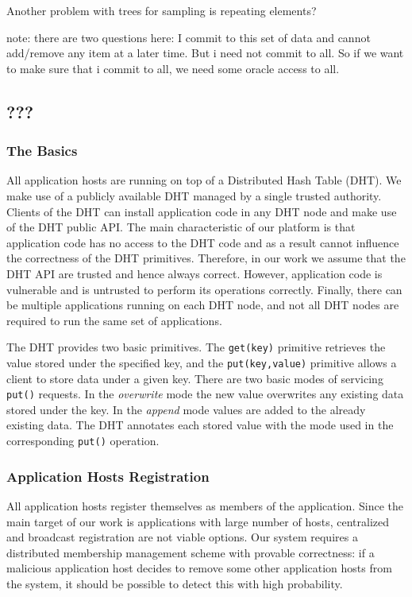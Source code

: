\documentclass[11pt,twocolumn]{MyTightStyle}
\theoremstyle{plain}
\theoremstyle{definition}
\theoremstyle{remark}
\numberwithin{equation}{section}
\begin{document}
Another problem with trees for sampling is repeating elements? 



note: there are two questions here: I commit to this set of data and
cannot add/remove any item at a later time. But i need not commit to
all. So if we want to make sure that i commit to all, we need some
oracle access to all.






\subsection{???}

\subsubsection{The Basics}
All application hosts are running on top of a Distributed Hash Table
(DHT). We make use of a publicly available DHT managed by a single
trusted authority. Clients of the DHT can install application code
in any DHT node and make use of the DHT public API. The main
characteristic of our platform is that application code has no access to
the DHT code and as a result cannot influence the correctness of the
DHT primitives. Therefore, in our work we assume that the DHT API are
trusted and hence always correct. However, application code is
vulnerable and is untrusted to perform its operations
correctly. Finally, there can be multiple applications running on
each DHT node, and not all DHT nodes are required to run the
same set of applications.

The DHT provides two basic primitives. The {\tt get(key)} primitive
retrieves the value stored under the specified key, and the
{\tt put(key,value)} primitive allows a client to store data under a
given key. There are two basic modes of servicing {\tt put()}
requests. In the \emph{overwrite} mode the new value overwrites any 
existing data stored under the key. In the \emph{append} mode values
are added to the already existing data. The DHT annotates each
stored value with the mode used in the corresponding {\tt put()}
operation.

\subsubsection{Application Hosts Registration}
All application hosts register themselves as members of the
application. Since the main target of our work is applications with
large number of hosts, centralized and broadcast registration are not
viable options. Our system requires a distributed membership
management scheme with provable correctness: if a malicious
application host decides to remove some other application hosts from
the system, it should be possible to detect this with high
probability. 
\end{document}
